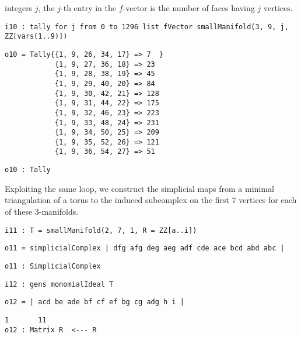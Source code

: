 \documentclass[12pt,leqno]{amsart}
\theoremstyle{definition}
\begin{document}
integers $j$, the $j$-th entry in the $f\!$-vector is the number of faces having
$j$ vertices.
\begin{lstlisting}[xleftmargin=10pt, lineskip=-5pt, aboveskip=3.0pt, belowskip=1.5pt]
i10 : tally for j from 0 to 1296 list fVector smallManifold(3, 9, j, ZZ[vars(1..9)])
\end{lstlisting}
\begin{lstlisting}[xleftmargin=10pt, lineskip=-5pt, aboveskip=4pt, belowskip=1.5pt]
o10 = Tally{{1, 9, 26, 34, 17} => 7  }
            {1, 9, 27, 36, 18} => 23
            {1, 9, 28, 38, 19} => 45
            {1, 9, 29, 40, 20} => 84
            {1, 9, 30, 42, 21} => 128
            {1, 9, 31, 44, 22} => 175
            {1, 9, 32, 46, 23} => 223
            {1, 9, 33, 48, 24} => 231
            {1, 9, 34, 50, 25} => 209
            {1, 9, 35, 52, 26} => 121
            {1, 9, 36, 54, 27} => 51
\end{lstlisting}
\begin{lstlisting}[xleftmargin=10pt, aboveskip=-5pt, belowskip=3.0pt]
o10 : Tally
\end{lstlisting}
Exploiting the same loop, we construct the simplicial maps from a minimal
triangulation of a torus to the induced subcomplex on the first $7$ vertices
for each of these $3$-manifolds.
\begin{lstlisting}[xleftmargin=10pt, aboveskip=3.0pt, belowskip=1.5pt]
i11 : T = smallManifold(2, 7, 1, R = ZZ[a..i])
\end{lstlisting}
\begin{lstlisting}[xleftmargin=10pt, aboveskip=1.5pt, belowskip=1.5pt]
o11 = simplicialComplex | dfg afg deg aeg adf cde ace bcd abd abc |
\end{lstlisting}
\begin{lstlisting}[xleftmargin=10pt, aboveskip=1.5pt, belowskip=1.5pt]
o11 : SimplicialComplex
\end{lstlisting}
\begin{lstlisting}[xleftmargin=10pt, aboveskip=1.5pt, belowskip=1.5pt]
i12 : gens monomialIdeal T
\end{lstlisting}
\begin{lstlisting}[xleftmargin=10pt, aboveskip=1.5pt, belowskip=1.5pt]
o12 = | acd be ade bf cf ef bg cg adg h i |
\end{lstlisting}
\begin{lstlisting}[xleftmargin=10pt, lineskip=-10pt, aboveskip=4pt, belowskip=1.5pt]
              1       11
o12 : Matrix R  <--- R
\end{lstlisting}
\end{document}
